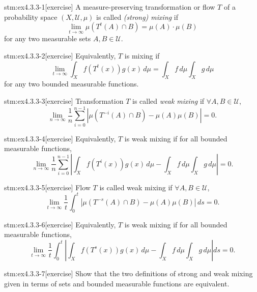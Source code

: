 
\begin{stm}{stm:ex4.3.3-1}[exercise]
A measure-preserving transformation or flow $T$ of a probability space $(X, \mathcal{U}, \mu)$ is called \textit{(strong) mixing} if
\[
\lim_{t \to \infty} \mu(T^t(A) \cap B) = \mu(A) \cdot \mu(B)
\]
for any two measurable sets $A, B \in \mathcal{U}$.
\end{stm}

\begin{stm}{stm:ex4.3.3-2}[exercise]
Equivalently, $T$ is mixing if
\[
\lim_{t \to \infty} \int_X f(T^t(x)) g(x) \, d\mu = \int_X f \, d\mu \int_X g \, d\mu
\]
for any two bounded measurable functions.
\end{stm}

\begin{stm}{stm:ex4.3.3-3}[exercise]
Transformation $T$ is called \textit{weak mixing} if $\forall A, B \in \mathcal{U}$,
\[
\lim_{n \to \infty} \frac{1}{n} \sum_{i=0}^{n-1} \left| \mu(T^{-i}(A) \cap B) - \mu(A)\mu(B) \right| = 0.
\]
\end{stm}

\begin{stm}{stm:ex4.3.3-4}[exercise]
Equivalently, $T$ is weak mixing if for all bounded measurable functions,
\[
\lim_{n \to \infty} \frac{1}{n} \sum_{i=0}^{n-1} \left| \int_X f(T^i(x)) g(x) \, d\mu - \int_X f \, d\mu \int_X g \, d\mu \right| = 0.
\]
\end{stm}

\begin{stm}{stm:ex4.3.3-5}[exercise]
Flow $T$ is called weak mixing if $\forall A, B \in \mathcal{U}$,
\[
\lim_{t \to \infty} \frac{1}{t} \int_0^t \left| \mu(T^{-s}(A) \cap B) - \mu(A)\mu(B) \right| \, ds = 0.
\]
\end{stm}

\begin{stm}{stm:ex4.3.3-6}[exercise]
Equivalently, $T$ is weak mixing if for all bounded measurable functions,
\[
\lim_{t \to \infty} \frac{1}{t} \int_0^t \left| \int_X f(T^s(x))g(x) \, d\mu - \int_X f \, d\mu \int_X g \, d\mu \right| ds = 0.
\]
\end{stm}

\begin{stm}{stm:ex4.3.3-7}[exercise]
Show that the two definitions of strong and weak mixing given in terms of sets and bounded measurable functions are equivalent.
\end{stm}


